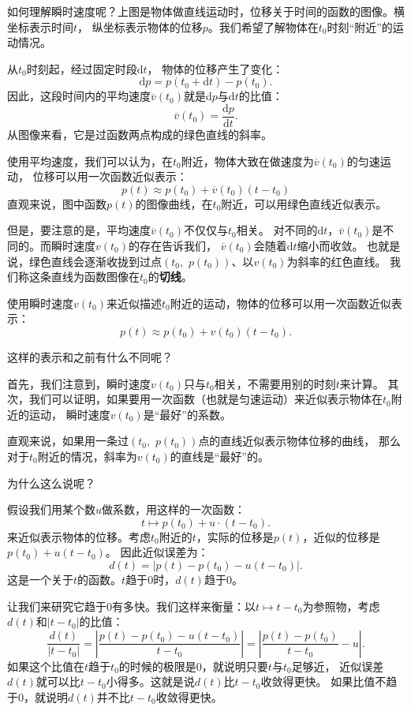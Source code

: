 \documentclass[12pt,UTF8]{ctexbook}
\theoremstyle{definition}
\theoremstyle{plain}
\begin{document}
如何理解瞬时速度呢？上图是物体做直线运动时，位移关于时间的函数的图像。横坐标表示时间$t$，
纵坐标表示物体的位移$p$。我们希望了解物体在$t_0$时刻“附近”的运动情况。

从$t_0$时刻起，经过固定时段$\mathrm{d}t$，
物体的位移产生了变化：
$$\mathrm{d}p = p(t_0 + \mathrm{d}t) - p(t_0).$$
因此，这段时间内的平均速度$\overline{v}(t_0)$就是$\mathrm{d}p$与$\mathrm{d}t$的比值：
$$\overline{v}(t_0) = \frac{\mathrm{d}p}{\mathrm{d}t}.$$
从图像来看，它是过函数两点构成的绿色直线的斜率。

使用平均速度，我们可以认为，在$t_0$附近，物体大致在做速度为$\overline{v}(t_0)$的匀速运动，
位移可以用一次函数近似表示：
$$ p(t) \approx p(t_0) + \overline{v}(t_0)(t - t_0)$$
直观来说，图中函数$p(t)$的图像曲线，在$t_0$附近，可以用绿色直线近似表示。

但是，要注意的是，平均速度$\overline{v}(t_0)$不仅仅与$t_0$相关。
对不同的$\mathrm{d}t$，$\overline{v}(t_0)$是不同的。而瞬时速度$v(t_0)$的存在告诉我们，
$\overline{v}(t_0)$会随着$\mathrm{d}t$缩小而收敛。
也就是说，绿色直线会逐渐收拢到过点$(t_0, \,\,p(t_0))$、以$v(t_0)$为斜率的红色直线。
我们称这条直线为函数图像在$t_0$的\textbf{切线}。

使用瞬时速度$v(t_0)$来近似描述$t_0$附近的运动，物体的位移可以用一次函数近似表示：
$$ p(t) \approx p(t_0) + v(t_0)(t - t_0).$$

这样的表示和之前有什么不同呢？

首先，我们注意到，瞬时速度$v(t_0)$只与$t_0$相关，不需要用别的时刻$t$来计算。
其次，我们可以证明，如果要用一次函数（也就是匀速运动）来近似表示物体在$t_0$附近的运动，
瞬时速度$v(t_0)$是“最好”的系数。

直观来说，如果用一条过$(t_0, \,\,p(t_0))$点的直线近似表示物体位移的曲线，
那么对于$t_0$附近的情况，斜率为$v(t_0)$的直线是“最好”的。

为什么这么说呢？

假设我们用某个数$u$做系数，用这样的一次函数：
$$ t \mapsto p(t_0) + u\cdot (t - t_0).$$
来近似表示物体的位移。考虑$t_0$附近的$t$，实际的位移是$p(t)$，近似的位移是$p(t_0) + u(t - t_0)$。
因此近似误差为：
$$ d(t) = \left|p(t) - p(t_0) - u(t - t_0)\right|. $$
这是一个关于$t$的函数。$t$趋于$0$时，$d(t)$趋于$0$。

让我们来研究它趋于$0$有多快。我们这样来衡量：以$t\mapsto t - t_0$为参照物，考虑$d(t)$和$|t - t_0|$的比值：
$$ \frac{d(t)}{|t - t_0|} = \left|\frac{p(t) - p(t_0) - u(t - t_0)}{t -  t_0}\right| =  \left|\frac{p(t) - p(t_0)}{t -  t_0} - u\right|. $$
如果这个比值在$t$趋于$t_0$的时候的极限是$0$，就说明只要$t$与$t_0$足够近，
近似误差$d(t)$就可以比$t-t_0$小得多。这就是说$d(t)$比$t-t_0$收敛得更快。
如果比值不趋于$0$，就说明$d(t)$并不比$t-t_0$收敛得更快。
\end{document}
